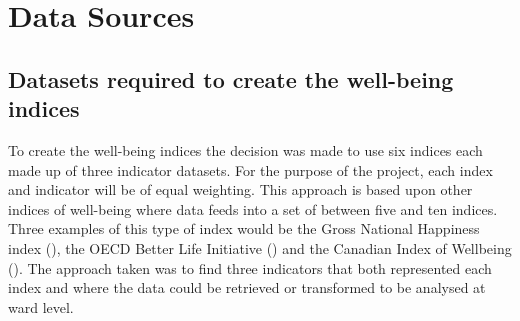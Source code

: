 
\chapter{Data Sources} %

\label{Chapter3} %


\section{Datasets required to create the well-being indices}

To create the well-being indices the decision was made to use six indices each made up of three indicator datasets. For the purpose of the project, each index and indicator will be of equal weighting.
This approach is based upon other indices of well-being where data feeds into a set of between five and ten indices. 
Three examples of this type of index would be the Gross National Happiness index (\cite{GNH}), the OECD Better Life Initiative (\cite{BLI}) and the Canadian Index of Wellbeing (\cite{CIW}). 
The approach taken was to find three indicators that both represented each index and where the data could be retrieved or transformed to be analysed at ward level.

